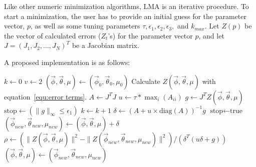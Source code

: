 \documentclass[english,12pt]{article}
\begin{document}
Like other numeric minimization algorithms, LMA is an iterative
procedure.  To start a minimization, the user has to provide an
initial guess for the parameter vector, $p$, as well as some tuning
parameters $\tau, \epsilon_1, \epsilon_2, \epsilon_3,$ and $k_{max}$.
Let $Z(p)$ be the vector of calculated errors ($Z_t$'s) for the
parameter vector $p$, and let $J = (J_{1}, J_{2}, \dots, J_N)^T$
be a Jacobian matrix.

A proposed implementation is as follows:

\begin{algorithm}[H]
    \SetAlgoLined
{}
\begin{algorithmic}[1]
	\State $k \leftarrow 0$  
	\State $v \leftarrow 2$ 
	\State $(\vec{\phi},\vec{\theta},\mu) \leftarrow (\vec{\phi}_0,\vec{\theta}_0,\mu_0)$ 
    \State Calculate $Z(\vec{\phi},\vec{\theta},\mu)$ with
    equation~\ref{equ:error terms}.  
	\State $A \leftarrow J^T J$   
	\State $u \leftarrow \tau * \max_i(A_{ii})$ 
	\State $g \leftarrow J^T Z(\vec{\phi},\vec{\theta},\mu)$ 
	\State $ \text{stop} \leftarrow (\|g\|_{\infty} \le \epsilon_1)$ 
		\State $k \leftarrow k + 1$
		\Repeat
			\State $\delta \leftarrow (A + u \times \text{diag}(A))^{-1} g$ 
			 
				\State  $\text{stop} \leftarrow \text{true}$
			\Else
				\State $(\vec{\phi}_{new},\vec{\theta}_{new},\mu_{new}) \leftarrow (\vec{\phi},\vec{\theta},\mu) + \delta$ 
				\State $\rho \leftarrow (\| Z(\vec{\phi},\vec{\theta},\mu)\|^2 - \| Z(\vec{\phi}_{new},\vec{\theta}_{new},\mu_{new})\|^2 )/(\delta^T(u \delta + g))$ 
				 
					\State $(\vec{\phi},\vec{\theta},\mu) \leftarrow (\vec{\phi}_{new},\vec{\theta}_{new},\mu_{new})$ 

\end{algorithmic}
\end{algorithm}
\end{document}
